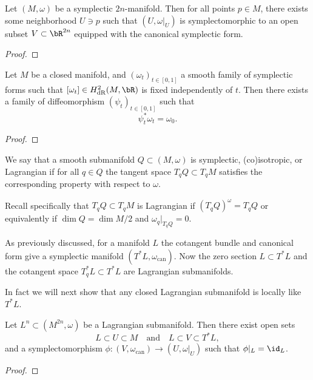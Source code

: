 \begin{thm*}[Darboux]
    Let $(M,\omega)$ be a symplectic $2n$-manifold.
    Then for all points $p\in M$, there exists some neighborhood $U\ni p$ such that $(U,\omega|_U)$ is symplectomorphic to an open subset 
$V\subset\bR^{2n}$ equipped with the canonical symplectic form.
\end{thm*}

\begin{proof}
\end{proof}

\begin{thm*}
    Let $M$ be a closed manifold, and $(\omega_t)_{t\in[0,1]}$ a smooth family of symplectic forms such that $[\omega_t]\in H^2_{\mathrm{dR}}(M,\bR)$ is fixed independently of $t$.
    Then there exists a family of diffeomorphism $(\psi_t)_{t\in[0,1]}$ such that
    \[\psi_t^*\omega_t=\omega_0.\]
\end{thm*}

\begin{proof}
\end{proof}

\begin{dfn}
    We say that a smooth submanifold $Q\subset(M,\omega)$ is symplectic, (co)isotropic, or Lagrangian if for all $q\in Q$ the tangent space $T_qQ\subset T_qM$ satisfies the corresponding property with respect to $\omega$.
\end{dfn}

Recall specifically that $T_qQ\subset T_qM$ is Lagrangian if $(T_qQ)^\omega=T_qQ$ or equivalently if $\dim Q=\dim M/2$ and $\omega_q|_{T_qQ}=0$.

\begin{example}
    As previously discussed, for a manifold $L$ the cotangent bundle and canonical form give a symplectic manifold $(T^*L,\omega_{\mathrm{can}})$.
    Now the zero section $L\subset T^*L$ and the cotangent space $T_q^*L\subset T^*L$ are Lagrangian submanifolds.
\end{example}

In fact we will next show that any closed Lagrangian submanifold is locally like $T^*L$.

\begin{thm*}
    Let $L^n\subset(M^{2n},\omega)$ be a Lagrangian submanifold.
    Then there exist open sets
    \[L\subset U\subset M\quad\text{and}\quad L\subset V\subset T^*L,\]
    and a symplectomorphism $\phi:(V,\omega_{\mathrm{can}})\to(U,\omega|_U)$ such that $\phi|_L=\id_L$.
\end{thm*}

\begin{proof}
\end{proof}
